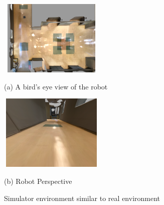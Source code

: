 \begin{figure}[h]
  \centering
  \begin{minipage}[b]{67mm}
    \centering
    \includegraphics[width=50mm, height=36mm]{images/real_sim_up.png}
    \caption*{(a) A bird's eye view of the robot}
  \end{minipage} 
  \begin{minipage}[b]{67mm}
    \centering
    \includegraphics[width=50mm, height=36mm]{images/real_sim_robot.png}
    \caption*{(b) Robot Perspective}
  \end{minipage}
  \caption{Simulator environment similar to real environment}
  \label{Fig:real_sim}
\end{figure}


\newpage
